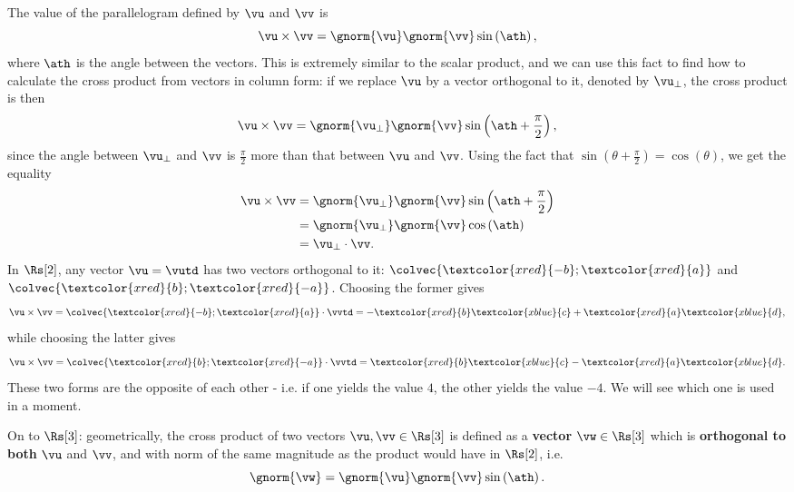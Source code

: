 The value of the parallelogram defined by $\vu$ and $\vv$ is
\begin{equation}
	\vu\times\vv = \gnorm{\vu}\gnorm{\vv}\sin \left( \ath \right),
	\label{eq:cross_product_geometric_area}
\end{equation}
where $\ath$ is the angle between the vectors. This is extremely similar to the scalar product, and we can use this fact to find how to calculate the cross product from vectors in column form: if we replace $\vu$ by a vector orthogonal to it, denoted by $\vu_{\perp}$, the cross product is then
\begin{equation}
	\vu\times\vv = \gnorm{\vu_{\perp}}\gnorm{\vv}\sin \left( \ath+\frac{\pi}{2} \right),
	\label{eq:cross_product_to_dot_product_part1}
\end{equation}
since the angle between $\vu_{\perp}$ and $\vv$ is $\frac{\pi}{2}$ more than that between $\vu$ and $\vv$. Using the fact that $\sin \left( \theta+\frac{\pi}{2} \right) = \cos \left( \theta \right)$, we get the equality
\begin{align}
	\vu\times\vv &= \gnorm{\vu_{\perp}}\gnorm{\vv}\sin \left( \ath+\frac{\pi}{2} \right)\nonumber\\
				 &= \gnorm{\vu_{\perp}}\gnorm{\vv}\cos \left( \ath \right)\nonumber\\
				 &= \vu_{\perp}\cdot\vv.
	\label{eq:cross_product_to_dot_product_part2}
\end{align}
In $\Rs[2]$, any vector $\vu=\vutd$ has two vectors orthogonal to it: $\colvec{\textcolor{xred}{-b};\textcolor{xred}{a}}$ and $\colvec{\textcolor{xred}{b};\textcolor{xred}{-a}}$. Choosing the former gives
\begin{equation}
	\vu\times\vv = \colvec{\textcolor{xred}{-b};\textcolor{xred}{a}} \cdot \vvtd = -\textcolor{xred}{b}\textcolor{xblue}{c}+\textcolor{xred}{a}\textcolor{xblue}{d},
	\label{eq:cross_product_2d_algebraic}
\end{equation}
while choosing the latter gives
\begin{equation}
	\vu\times\vv = \colvec{\textcolor{xred}{b};\textcolor{xred}{-a}} \cdot \vvtd = \textcolor{xred}{b}\textcolor{xblue}{c}-\textcolor{xred}{a}\textcolor{xblue}{d}.
	\label{eq:}
\end{equation}
These two forms are the opposite of each other - i.e. if one yields the value $4$, the other yields the value $-4$. We will see which one is used in a moment.

On to $\Rs[3]$: geometrically, the cross product of two vectors $\vu,\vv\in\Rs[3]$ is defined as a \textbf{vector} $\vw\in\Rs[3]$ which is \textbf{orthogonal to both} $\vu$ and $\vv$, and with norm of the same magnitude as the product would have in $\Rs[2]$, i.e.
\begin{equation}
	\gnorm{\vw} = \gnorm{\vu}\gnorm{\vv}\sin\left(\ath\right).
	\label{eq:cross product geometry}
\end{equation}

